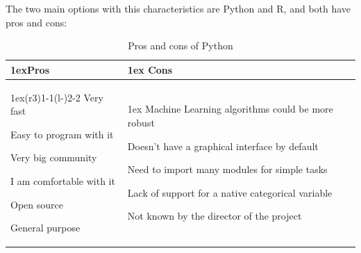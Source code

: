 \documentclass{article}
\begin{document}
    The two main options with this characteristics are Python\cite{python} and R\cite{r}, and both
    have pros and cons:
        \begin{table}[H]
        \begin{tabularx}{\linewidth}{>{\parskip1ex}X@{\kern4\tabcolsep}>{\parskip1ex}X}
        \toprule
        \hfil\bfseries Pros
        &
        \hfil\bfseries Cons
        \\\cmidrule(r{3\tabcolsep}){1-1}\cmidrule(l{-\tabcolsep}){2-2}
        Very fast\par
        Easy to program with it\par
        Very big community \par
        I am comfortable with it\par
        Open source \par
        General purpose \par
        &
        Machine Learning algorithms could be more robust\par
        Doesn't have a graphical interface by default\par
        Need to import many modules for simple tasks\par
        Lack of support for a native categorical variable\par
        Not known by the director of the project\par
        \\\bottomrule
        \end{tabularx}
        \caption{Pros and cons of Python}
        \end{table}
\end{document}
